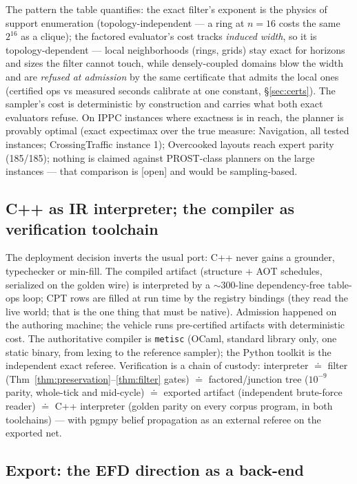 \documentclass[11pt]{article}
\newcommand{\metisc}{\texttt{metisc}}
\newcommand{\stopen}{[\textsf{open}]}
\theoremstyle{plain}
\theoremstyle{definition}
\theoremstyle{remark}
\begin{document}
The pattern the table quantifies: the exact filter's exponent is the
physics of support enumeration (topology-independent --- a ring at
$n = 16$ costs the same $2^{16}$ as a clique); the factored evaluator's
cost tracks \emph{induced width}, so it is topology-dependent --- local
neighborhoods (rings, grids) stay exact for horizons and sizes the
filter cannot touch, while densely-coupled domains blow the width and
are \emph{refused at admission} by the same certificate that admits the
local ones (certified ops vs measured seconds calibrate at one
constant, \S\ref{sec:certs}). The sampler's cost is deterministic by
construction and carries what both exact evaluators refuse. On IPPC
instances where exactness is in reach, the planner is provably optimal
(exact expectimax over the true measure: Navigation, all tested
instances; CrossingTraffic instance 1); Overcooked layouts reach expert
parity (185/185); nothing is claimed against PROST-class planners on
the large instances --- that comparison is \stopen{} and would be
sampling-based.

\subsection{C++ as IR interpreter; the compiler as verification
toolchain}\label{sec:cpp}

The deployment decision inverts the usual port: C++ never gains a
grounder, typechecker or min-fill. The compiled artifact (structure +
AOT schedules, serialized on the golden wire) is interpreted by a
$\sim$300-line dependency-free table-ops loop; CPT rows are filled at
run time by the registry bindings (they read the live world; that is
the one thing that must be native). Admission happened on the authoring
machine; the vehicle runs pre-certified artifacts with deterministic
cost. The authoritative compiler is \metisc{} (OCaml, standard library
only, one static binary, from lexing to the reference sampler); the
Python toolkit is the independent exact referee. Verification is a chain of custody: interpreter $\doteq$
filter (Thm~\ref{thm:preservation}--\ref{thm:filter} gates) $\doteq$
factored/junction tree ($10^{-9}$ parity, whole-tick and mid-cycle)
$\doteq$ exported artifact (independent brute-force reader) $\doteq$
C++ interpreter (golden parity on every corpus program, in both
toolchains) --- with pgmpy
belief propagation as an external referee on the exported net.

\subsection{Export: the EFD direction as a back-end}\label{sec:export}
\end{document}
